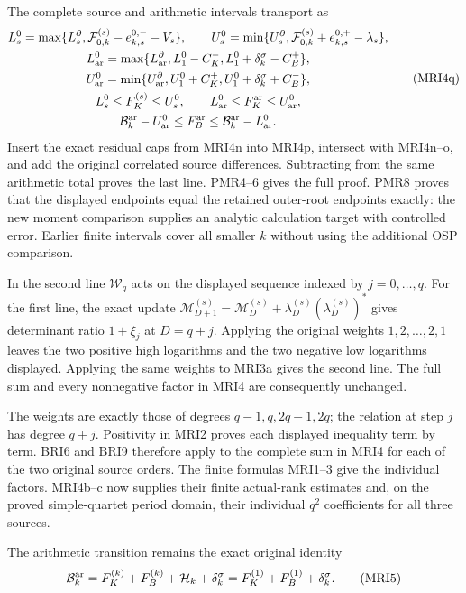 \documentclass[11pt,a4paper]{article}
\begin{document}
The complete source and arithmetic intervals transport as
\[
 \begin{gathered}
 L_s^0=\max\{L_s^\partial,\mathcal F_{0,k}^{(s)}-e_{k,s}^{0,-}-V_s\},\qquad
 U_s^0=\min\{U_s^\partial,\mathcal F_{0,k}^{(s)}+e_{k,s}^{0,+}-\lambda_s\},\\
 L_{\rm ar}^0=\max\{L_{\rm ar}^\partial,L_1^0-C_K^-,
                                    L_1^0+\delta_k^\sigma-C_B^+\},\\
 U_{\rm ar}^0=\min\{U_{\rm ar}^\partial,U_1^0+C_K^+,
                                    U_1^0+\delta_k^\sigma+C_B^-\},\\
 L_s^0\le F_K^{(s)}\le U_s^0,\qquad
 L_{\rm ar}^0\le F_K^{\rm ar}\le U_{\rm ar}^0,\\
 \mathcal B_k^{\rm ar}-U_{\rm ar}^0
      \le F_B^{\rm ar}\le\mathcal B_k^{\rm ar}-L_{\rm ar}^0.
 \end{gathered}\tag{MRI4q}
\]
Insert the exact residual caps from MRI4n into MRI4p, intersect
with MRI4n--o, and add the original correlated source differences.
Subtracting from the same arithmetic total proves the last line.
PMR4--6 gives the full proof. PMR8 proves that the displayed
endpoints equal the retained outer-root endpoints exactly:
the new moment comparison supplies an analytic calculation
target with controlled error. Earlier finite intervals cover all
smaller $k$ without using the additional OSP comparison.


In the second line $\mathcal W_q$ acts on the displayed sequence
indexed by $j=0,\ldots,q$. For the first line, the exact update
$\mathcal M_{D+1}^{(s)}=\mathcal M_D^{(s)}
+\lambda_D^{(s)}(\lambda_D^{(s)})^*$ gives determinant ratio
$1+\xi_j$ at $D=q+j$. Applying the original weights
$1,2,\ldots,2,1$ leaves the two positive high logarithms and
the two negative low logarithms displayed. Applying the same
weights to MRI3a gives the second line. The full sum and every
nonnegative factor in MRI4 are consequently unchanged.

The weights are exactly those of degrees $q-1,q,2q-1,2q$;
the relation at step $j$ has degree $q+j$. Positivity in MRI2
proves each displayed inequality term by term. BRI6 and BRI9
therefore apply to the complete sum in MRI4 for each of the
two original source orders. The finite formulas MRI1--3 give
the individual factors. MRI4b--c now supplies their finite
actual-rank estimates and, on the proved simple-quartet period
domain, their individual $q^2$ coefficients for all three sources.

The arithmetic transition remains the exact original identity
\[
 \mathcal B_k^{\rm ar}
   =F_K^{(k)}+F_B^{(k)}+\mathcal H_k+\delta_k^\sigma
   =F_K^{(1)}+F_B^{(1)}+\delta_k^\sigma.
 \tag{MRI5}
\]
\end{document}
